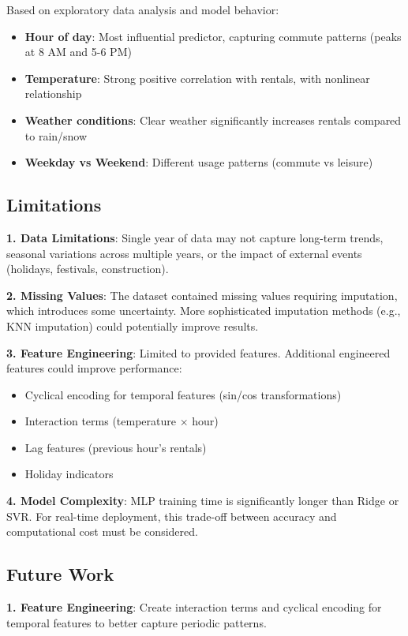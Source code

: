 \documentclass[conference]{IEEEtran}
\begin{document}
Based on exploratory data analysis and model behavior:
\begin{itemize}
    \item \textbf{Hour of day}: Most influential predictor, capturing commute patterns (peaks at 8 AM and 5-6 PM)
    \item \textbf{Temperature}: Strong positive correlation with rentals, with nonlinear relationship
    \item \textbf{Weather conditions}: Clear weather significantly increases rentals compared to rain/snow
    \item \textbf{Weekday vs Weekend}: Different usage patterns (commute vs leisure)
\end{itemize}

\subsection{Limitations}

\textbf{1. Data Limitations}: Single year of data may not capture long-term trends, seasonal variations across multiple years, or the impact of external events (holidays, festivals, construction).

\textbf{2. Missing Values}: The dataset contained missing values requiring imputation, which introduces some uncertainty. More sophisticated imputation methods (e.g., KNN imputation) could potentially improve results.

\textbf{3. Feature Engineering}: Limited to provided features. Additional engineered features could improve performance:
\begin{itemize}
    \item Cyclical encoding for temporal features (sin/cos transformations)
    \item Interaction terms (temperature $\times$ hour)
    \item Lag features (previous hour's rentals)
    \item Holiday indicators
\end{itemize}

\textbf{4. Model Complexity}: MLP training time is significantly longer than Ridge or SVR. For real-time deployment, this trade-off between accuracy and computational cost must be considered.

\subsection{Future Work}

\textbf{1. Feature Engineering}: Create interaction terms and cyclical encoding for temporal features to better capture periodic patterns.
\end{document}
